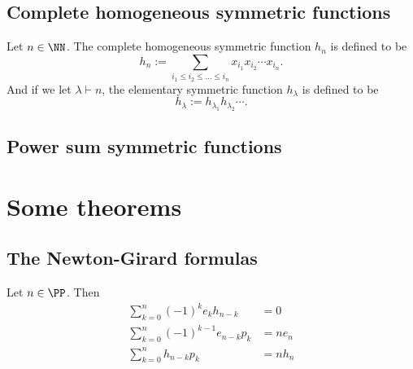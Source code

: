 \documentclass{article}
\begin{document}
\subsection{Complete homogeneous symmetric functions}

\begin{definition}
    Let $n\in\NN$. The complete homogeneous symmetric function $h_n$ is defined to be
    \[
        h_n := \sum_{i_1\leq i_2\leq\ldots\leq i_n} x_{i_1}x_{i_2}\cdots x_{i_n}.
    \]
    And if we let $\lambda \vdash n$, the elementary symmetric function $h_\lambda$ is defined to be
    \[
        h_\lambda := h_{\lambda_1}h_{\lambda_2}\cdots.
    \]
\end{definition}
\subsection{Power sum symmetric functions}

\section{Some theorems}

\subsection{The Newton-Girard formulas}

\begin{theorem}
    Let $n \in \PP$. Then
    \begin{align}
        \sum_{k=0}^n (-1)^k e_kh_{n-k} &= 0 \label{ng1} \\
        \sum_{k=0}^n (-1)^{k-1} e_{n-k}p_k &= ne_n  \label{ng2} \\
        \sum_{k=0}^n h_{n-k}p_k &= nh_n \label{ng3}
    \end{align}
\end{theorem}
\end{document}
